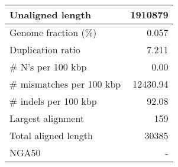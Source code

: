 \documentclass[12pt,a4paper]{article}
\begin{document}
\begin{table}[ht]
\begin{center}
\begin{tabular}{|l*{1}{|r}|}
Unaligned length & 1910879 \\ \hline
Genome fraction (\%) & 0.057 \\ \hline
Duplication ratio & 7.211 \\ \hline
\# N's per 100 kbp & 0.00 \\ \hline
\# mismatches per 100 kbp & 12430.94 \\ \hline
\# indels per 100 kbp & 92.08 \\ \hline
Largest alignment & 159 \\ \hline
Total aligned length & 30385 \\ \hline
NGA50 & - \\ \hline
\end{tabular}
\end{center}
\end{table}
\end{document}
